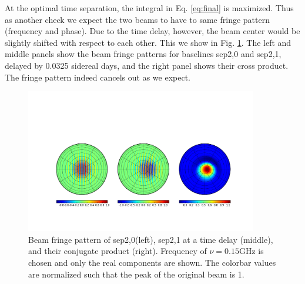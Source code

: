 \documentclass[twocolumn,apj,numberedappendix]{emulateapj}
\renewcommand\[{\begin{equation}}
\renewcommand\]{\end{equation}}
\begin{document}
At the optimal time separation, the integral in Eq. \eqref{eq:final}
is maximized. Thus as another check we expect the two beams to have to same fringe pattern
(frequency and phase). Due to the time delay, however, the beam center
would be slightly shifted with respect to each other. This we show
in Fig. \ref{fig:Beam-fringe-pattern}. The left and middle panels show the beam fringe
patterns for baselines sep2,0 and sep2,1, delayed by 0.0325 sidereal days,
and the right panel shows their cross product. The fringe pattern
indeed cancels out as we expect. 


\begin{figure}[h!]
\includegraphics[width=0.9\textwidth]{fringe_res}
\caption{Beam fringe pattern of sep2,0(left), sep2,1 at a time delay (middle),
and their conjugate product (right). Frequency of $\nu=0.15\text{GHz}$ is
chosen and only the real components are shown. The colorbar values are normalized such that the peak of the original beam is 1. \label{fig:Beam-fringe-pattern}}
\end{figure}
\end{document}
